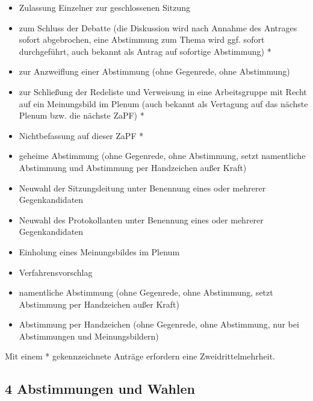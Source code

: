 \begin{enumerate}
\begin{itemize}
\item Zulassung Einzelner zur geschlossenen Sitzung

\item zum Schluss der Debatte (die Diskussion wird nach Annahme des
Antrages sofort abgebrochen, eine Abstimmung zum Thema wird ggf.
sofort durchgeführt, auch bekannt als \textquotedbl{}Antrag auf sofortige Abstimmung\textquotedbl{}) *

\item zur Anzweiflung einer Abstimmung (ohne Gegenrede, ohne Abstimmung)

\item zur Schließung der Redeliste und Verweisung in eine Arbeitsgruppe mit
Recht auf ein Meinungsbild im Plenum (auch bekannt als \textquotedbl{}Vertagung auf das
nächste Plenum bzw. die nächste ZaPF\textquotedbl{}) *

\item Nichtbefassung auf dieser ZaPF *

\item geheime Abstimmung (ohne Gegenrede, ohne Abstimmung, setzt namentliche
Abstimmung und Abstimmung per Handzeichen außer Kraft)

\item Neuwahl der Sitzungsleitung unter Benennung eines oder mehrerer Gegenkandidaten

\item Neuwahl des Protokollanten unter Benennung eines oder mehrerer Gegenkandidaten

\item Einholung eines Meinungsbildes im Plenum

\item Verfahrensvorschlag

\item namentliche Abstimmung (ohne Gegenrede, ohne Abstimmung, setzt Abstimmung
per Handzeichen außer Kraft)

\item Abstimmung per Handzeichen (ohne Gegenrede, ohne Abstimmung, nur bei
Abstimmungen und Meinungsbildern)
\end{itemize}

Mit einem * gekennzeichnete Anträge erfordern eine Zweidrittelmehrheit.
\end{enumerate}


\subsection*{4 Abstimmungen und Wahlen%
  \label{abstimmungen-und-wahlen}%
}

